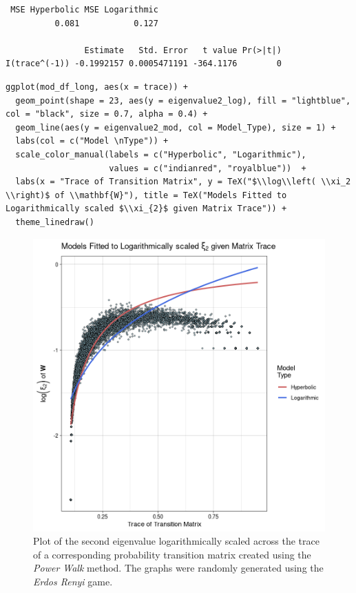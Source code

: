 \documentclass[11pt]{article}
\begin{document}
\begin{verbatim}
 MSE Hyperbolic MSE Logarithmic
          0.081           0.127

                Estimate   Std. Error   t value Pr(>|t|)
I(trace^(-1)) -0.1992157 0.0005471191 -364.1176        0
\end{verbatim}


\begin{verbatim}
ggplot(mod_df_long, aes(x = trace)) +
  geom_point(shape = 23, aes(y = eigenvalue2_log), fill = "lightblue", col = "black", size = 0.7, alpha = 0.4) +
  geom_line(aes(y = eigenvalue2_mod, col = Model_Type), size = 1) +
  labs(col = c("Model \nType")) +
  scale_color_manual(labels = c("Hyperbolic", "Logarithmic"),
                     values = c("indianred", "royalblue"))  +
  labs(x = "Trace of Transition Matrix", y = TeX("$\\log\\left( \\xi_2 \\right)$ of \\mathbf{W}"), title = TeX("Models Fitted to Logarithmically scaled $\\xi_{2}$ given Matrix Trace")) +
  theme_linedraw()
\end{verbatim}

\begin{figure}[htbp]
\centering
\includegraphics[width=12cm]{media/trace_models_fitted.png}
\caption{\label{fig:mod_trace_plot}Plot of the second eigenvalue logarithmically scaled across the trace of a corresponding probability transition matrix created using the \emph{Power Walk} method. The graphs were randomly generated using the \emph{Erdos Renyi} game.}
\end{figure}
\end{document}

